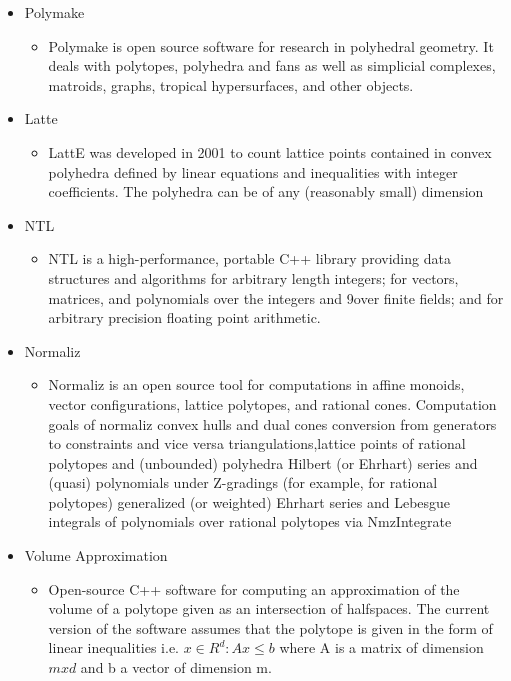 \documentclass[12pt,twoside]{article}
\begin{document}
\begin{itemize}
\begin{itemize}
	\end{itemize}
	\newpage
	\item Polymake
	\begin{itemize}
		\item Polymake is open source software for research in polyhedral
geometry. It deals with polytopes, polyhedra and fans as well
as simplicial complexes, matroids, graphs, tropical hypersurfaces, and other objects.
	\end{itemize}
	\item Latte
	\begin{itemize}
		\item LattE was developed in 2001 to count lattice points contained
in convex polyhedra defined by linear equations and
inequalities with integer coefficients. The polyhedra can be of
any (reasonably small) dimension
	\end{itemize}

 	\item NTL
 	\begin{itemize}
 		\item NTL is a high-performance, portable C++ library providing
data structures and algorithms for arbitrary length integers;
for vectors, matrices, and polynomials over the integers and
9over finite fields; and for arbitrary precision floating point
arithmetic.
 	\end{itemize}
 
	\item Normaliz
 	\begin{itemize}
 		\item Normaliz is an open source tool for computations in affine
monoids, vector configurations, lattice polytopes, and rational
cones. Computation goals of normaliz convex hulls and dual
cones conversion from generators to constraints and vice versa
triangulations,lattice points of rational polytopes and (unbounded)
 polyhedra Hilbert (or Ehrhart) series and (quasi) polynomials under Z-gradings (for example, for rational polytopes) generalized (or weighted) Ehrhart series and Lebesgue
integrals of polynomials over rational polytopes via NmzIntegrate
 	\end{itemize}

	\item Volume Approximation
 	\begin{itemize}
 		\item Open-source C++ software for computing an approximation of the
volume of a polytope given as an intersection of halfspaces. The
current version of the software assumes that the polytope is given in
the form of linear inequalities i.e. ${x \in R^d : Ax \leq b}$ where A is a
matrix of dimension $mxd$ and b a vector of dimension m.
 	\end{itemize}

	
\end{itemize}
\end{document}
